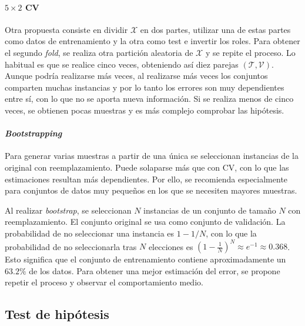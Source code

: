 \paragraph{$5 \times 2$ CV} Otra propuesta consiste en 
dividir $\mathcal{X}$ en dos partes, utilizar una de estas 
partes como datos de entrenamiento y la otra como test e 
invertir los roles. Para obtener el segundo \textit{fold}, se 
realiza otra partición aleatoria de $\mathcal{X}$ y se repite 
el proceso. Lo habitual es que se realice cinco veces, 
obteniendo así diez parejas $(\mathcal{T}, \mathcal{V})$. 
Aunque podría realizarse más veces, al realizarse más veces 
los conjuntos comparten muchas instancias y por lo tanto los 
errores son muy dependientes entre sí, con lo que no se 
aporta nueva información. Si se realiza menos de cinco veces, 
se obtienen pocas muestras y es más complejo comprobar las 
hipótesis.

\paragraph{\textit{Bootstrapping}} Para generar varias 
muestras a partir de una única se seleccionan instancias de 
la original con reemplazamiento. Puede solaparse más que con 
CV, con lo que las estimaciones resultan más dependientes. 
Por ello, se recomienda especialmente para conjuntos de datos 
muy pequeños en los que se necesiten mayores muestras. 

	Al realizar \textit{bootstrap}, se seleccionan $N$ 
instancias de un conjunto de tamaño $N$ con reemplazamiento. 
El conjunto original se usa como conjunto de validación. La 
probabilidad de no seleccionar una instancia es $1-1/N$, con 
lo que la probabilidad de no seleccionarla tras $N$ 
elecciones es $\left(1- \frac{1}{N}\right)^N \approx e^{-1} 
\approx 0.368$. Esto significa que el conjunto de 
entrenamiento contiene aproximadamente un $63.2\%$ de los 
datos. Para obtener una mejor estimación del error, se 
propone repetir el proceso y observar el comportamiento 
medio.
	
\subsection{Test de hipótesis}


